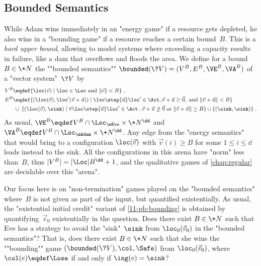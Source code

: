 \subsection{Bounded Semantics}
\label{11-bounding}

While Adam wins immediately in an "energy game" if a resource gets
depleted, he also wins in a "bounding game" if a resource reaches a
certain bound~$B$.  %
This is
a \emph{hard upper bound}, allowing to model systems where exceeding a
capacity results in failure, like a dam that overflows and floods the
area.  We define for a bound~$B\in\+N$ the ""bounded semantics""
$\bounded(\?V)=(V^B,E^B,\VE^B,\VA^B)$ of a "vector system"~$\?V$ by
\begin{align*}
  V^B&\eqdef\{\loc(\vec v)\mid\loc\in\Loc\text{ and }\|\vec v\|<B\}\;,\\
  E^B&\eqdef \{(\loc(\vec v),\loc'(\vec v+\vec u))\mid\loc\step{\vec
       u}\loc'\in\Act,\vec v+\vec u\geq\vec 0,\text{ and }\|\vec
       v+\vec u\|<B\}\\
     &\:\cup\:\{(\loc(\vec v),\sink)\mid\forall\loc\step{\vec
               u}\loc'\in\Act\mathbin.\vec v+\vec u\not\geq\vec
               0\text{ or }\|\vec v+\vec u\|\geq B\}
     \cup\{(\sink,\sink)\}\;.
\end{align*}
As usual, $\VE^B\eqdef V^B\cap\Loc_\mEve\times\+N^\dd$ and
$\VA^B\eqdef V^B\cap\Loc_\mAdam\times\+N^\dd$.  Any edge from the
"energy semantics" that would bring to a configuration $\loc(\vec v)$
with $\vec v(i)\geq B$ for some $1\leq i\leq\dd$ leads instead to the
sink.  All the configurations in this arena have "norm" less than~$B$,
thus $|V^B|=|\Loc| B^\dd+1$, and the qualitative games of
\cref{chap:regular} are decidable over this "arena".

Our focus here is on "non-termination" games played on the "bounded
semantics" where~$B$ is not given as part of the input, but quantified
existentially.  As usual, the "existential initial credit" variant
of \cref{11-pb-bounding} is obtained by quantifying~$\vec v_0$
existentially in the question.
%
  {Does there exist $B\in\+N$ such that Eve has a strategy to avoid the
  "sink"~$\sink$ from $\loc_0(\vec v_0)$ in the "bounded
  semantics"?  That is, does there exist $B\in\+N$ such that she wins
  the ""bounding"" game $(\bounded(\?V),\col,\Safe)$ from
  $\loc_0(\vec v_0)$, where $\col(e)\eqdef\Lose$ if and only if $\ing(e)=\sink$?}

